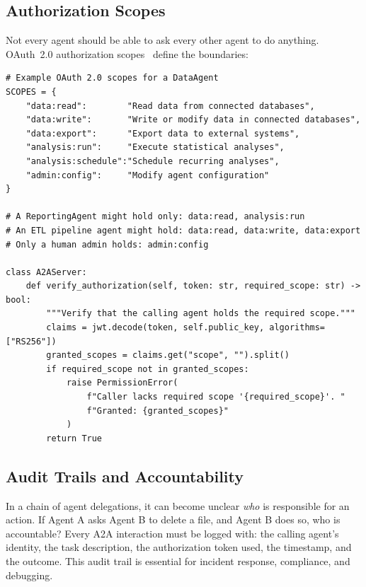 \subsection{Authorization Scopes}
\label{authorization-scopes}

Not every agent should be able to ask every other agent to do anything. OAuth~2.0 authorization scopes~\cite{rfc6749} define the boundaries:

\begin{lstlisting}[style=pythonstyle]
# Example OAuth 2.0 scopes for a DataAgent
SCOPES = {
    "data:read":        "Read data from connected databases",
    "data:write":       "Write or modify data in connected databases",
    "data:export":      "Export data to external systems",
    "analysis:run":     "Execute statistical analyses",
    "analysis:schedule":"Schedule recurring analyses",
    "admin:config":     "Modify agent configuration"
}

# A ReportingAgent might hold only: data:read, analysis:run
# An ETL pipeline agent might hold: data:read, data:write, data:export
# Only a human admin holds: admin:config

class A2AServer:
    def verify_authorization(self, token: str, required_scope: str) -> bool:
        """Verify that the calling agent holds the required scope."""
        claims = jwt.decode(token, self.public_key, algorithms=["RS256"])
        granted_scopes = claims.get("scope", "").split()
        if required_scope not in granted_scopes:
            raise PermissionError(
                f"Caller lacks required scope '{required_scope}'. "
                f"Granted: {granted_scopes}"
            )
        return True
\end{lstlisting}

\subsection{Audit Trails and Accountability}
\label{audit-trails-and-accountability}

\begin{warningbox}
In a chain of agent delegations, it can become unclear \emph{who} is responsible for an action. If Agent A asks Agent B to delete a file, and Agent B does so, who is accountable? Every A2A interaction must be logged with: the calling agent’s identity, the task description, the authorization token used, the timestamp, and the outcome. This audit trail is essential for incident response, compliance, and debugging.
\end{warningbox}

